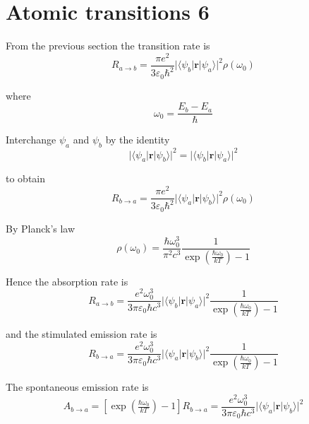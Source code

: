 

\section*{Atomic transitions 6}

From the previous section the transition rate is
\begin{equation*}
R_{a\rightarrow b}
=\frac{\pi e^2}{3\varepsilon_0\hbar^2}
\bigl|\langle\psi_b|\mathbf r|\psi_a\rangle\bigr|^2\rho(\omega_0)
\end{equation*}

where
\begin{equation*}
\omega_0=\frac{E_b-E_a}{\hbar}
\end{equation*}

Interchange $\psi_a$ and $\psi_b$ by the identity
\begin{equation*}
\bigl|\langle\psi_a|\mathbf r|\psi_b\rangle\bigr|^2
=\bigl|\langle\psi_b|\mathbf r|\psi_a\rangle\bigr|^2
\end{equation*}

to obtain
\begin{equation*}
R_{b\rightarrow a}
=\frac{\pi e^2}{3\varepsilon_0\hbar^2}
\bigl|\langle\psi_a|\mathbf r|\psi_b\rangle\bigr|^2\rho(\omega_0)
\end{equation*}

By Planck's law
\begin{equation*}
\rho(\omega_0)=\frac{\hbar\omega_0^3}{\pi^2c^3}
\frac{1}{\exp\left(\frac{\hbar\omega_0}{kT}\right)-1}
\end{equation*}

Hence the absorption rate is
\begin{equation*}
R_{a\rightarrow b}
=\frac{e^2\omega_0^3}{3\pi\varepsilon_0\hbar c^3}
\bigl|\langle\psi_b|\mathbf r|\psi_a\rangle\bigr|^2
\frac{1}{\exp\left(\frac{\hbar\omega_0}{kT}\right)-1}
\tag{1}
\end{equation*}

and the stimulated emission rate is
\begin{equation*}
R_{b\rightarrow a}
=\frac{e^2\omega_0^3}{3\pi\varepsilon_0\hbar c^3}
\bigl|\langle\psi_a|\mathbf r|\psi_b\rangle\bigr|^2
\frac{1}{\exp\left(\frac{\hbar\omega_0}{kT}\right)-1}
\tag{2}
\end{equation*}

The spontaneous emission rate is
\begin{equation*}
A_{b\rightarrow a}=\left[\exp\left(\tfrac{\hbar\omega_0}{kT}\right)-1\right]R_{b\rightarrow a}
=\frac{e^2\omega_0^3}{3\pi\varepsilon_0\hbar c^3}
\bigl|\langle\psi_a|\mathbf r|\psi_b\rangle\bigr|^2
\tag{3}
\end{equation*}

